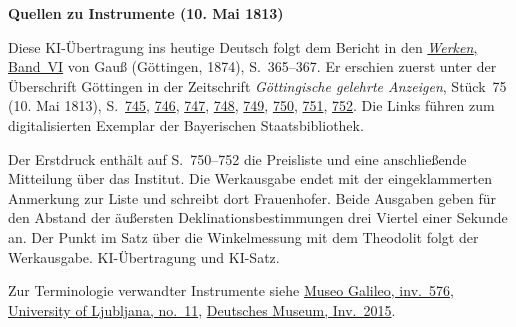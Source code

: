 \clearpage\thispagestyle{empty}
\begin{center}\textbf{Quellen zu Instrumente (10. Mai 1813)}\end{center}
\noindent Diese KI-Übertragung ins heutige Deutsch folgt dem Bericht in den \href{https://gdz.sub.uni-goettingen.de/id/PPN236007467}{\textit{Werken}, Band~VI} von Gauß (Göttingen, 1874), S.~365--367. Er erschien zuerst unter der Überschrift Göttingen in der Zeitschrift \textit{Göttingische gelehrte Anzeigen}, Stück~75 (10. Mai 1813), S.~\href{https://api.digitale-sammlungen.de/iiif/image/v2/bsb10538683_00757/full/1600,/0/default.jpg}{745}, \href{https://api.digitale-sammlungen.de/iiif/image/v2/bsb10538683_00758/full/1600,/0/default.jpg}{746}, \href{https://api.digitale-sammlungen.de/iiif/image/v2/bsb10538683_00759/full/1600,/0/default.jpg}{747}, \href{https://api.digitale-sammlungen.de/iiif/image/v2/bsb10538683_00760/full/1600,/0/default.jpg}{748}, \href{https://api.digitale-sammlungen.de/iiif/image/v2/bsb10538683_00761/full/1600,/0/default.jpg}{749}, \href{https://api.digitale-sammlungen.de/iiif/image/v2/bsb10538683_00762/full/1600,/0/default.jpg}{750}, \href{https://api.digitale-sammlungen.de/iiif/image/v2/bsb10538683_00763/full/1600,/0/default.jpg}{751}, \href{https://api.digitale-sammlungen.de/iiif/image/v2/bsb10538683_00764/full/1600,/0/default.jpg}{752}. Die Links führen zum digitalisierten Exemplar der Bayerischen Staatsbibliothek.
\par\smallskip\noindent Der Erstdruck enthält auf S.~750--752 die Preisliste und eine anschließende Mitteilung über das Institut. Die Werkausgabe endet mit der eingeklammerten Anmerkung zur Liste und schreibt dort Frauenhofer. Beide Ausgaben geben für den Abstand der äußersten Deklinationsbestimmungen drei Viertel einer Sekunde an. Der Punkt im Satz über die Winkelmessung mit dem Theodolit folgt der Werkausgabe. KI-Übertragung und KI-Satz.
\par\smallskip\noindent Zur Terminologie verwandter Instrumente siehe \href{https://catalogue.museogalileo.it/object/RepeatingCircle.html}{Museo Galileo, inv.~576}, \href{https://zbirka.fgg.uni-lj.si/en/instrument/11}{University of Ljubljana, no.~11}, \href{https://digital.deutsches-museum.de/projekte/gruendungssammlung/detail/2015/}{Deutsches Museum, Inv.~2015}.
\clearpage
